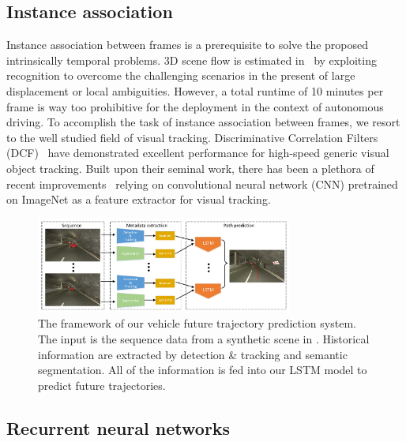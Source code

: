 \documentclass[10pt,twocolumn,letterpaper]{article}
\begin{document}
\subsection{Instance association}
Instance association between frames is a prerequisite to solve the proposed intrinsically temporal problems.  3D scene flow is estimated in~\cite{behl2017bounding} by exploiting recognition to overcome the challenging scenarios in the present of large displacement or local ambiguities.
However, a total runtime of 10 minutes per frame is way too prohibitive for the deployment in the context of autonomous driving.
To accomplish the task of instance association between frames, we resort to the well studied field of visual tracking.
Discriminative Correlation Filters (DCF)~\cite{henriques2015high} have demonstrated excellent performance for high-speed generic visual object tracking.
Built upon their seminal work, there has been a plethora of recent improvements~\cite{wang2016stct, wang2015visual, hong2015online, ma2015hierarchical,danelljan2016beyond,held2016learning, wu2017kernalised,danelljan2017eco} relying on convolutional neural network (CNN) pretrained on ImageNet as a feature extractor for visual tracking.

\begin{figure}[t]
        \centering
        \includegraphics[width=0.75\textwidth]{figures/framework.pdf}
        \caption{ {\small The framework of our vehicle future trajectory prediction system. The input is the sequence data from a synthetic scene in \cite{mueller2016benchmark}. Historical information are extracted by detection & tracking and semantic segmentation. All of the information is fed into our LSTM model to predict future trajectories.}}
        \label{fig:framework}
\end{figure}


\subsection{Recurrent neural networks}
\end{document}
